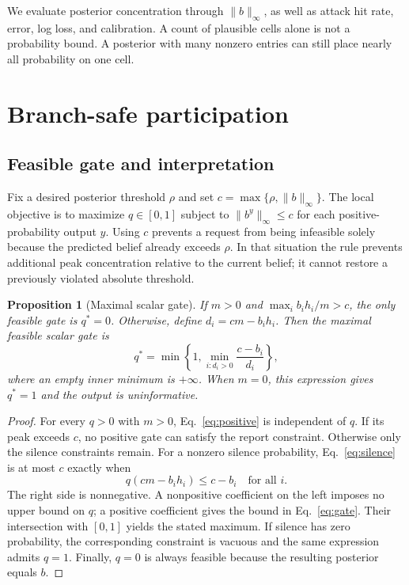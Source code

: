 \documentclass[review,12pt]{elsarticle}
\newtheorem{proposition}{Proposition}
\begin{document}
We evaluate posterior concentration through $\|b\|_\infty$, as well as attack hit rate, error, log loss, and calibration. A count of plausible cells alone is not a probability bound. A posterior with many nonzero entries can still place nearly all probability on one cell.

\section{Branch-safe participation}
\label{sec:method}
\subsection{Feasible gate and interpretation}
Fix a desired posterior threshold $\rho$ and set $c=\max\{\rho,\|b\|_\infty\}$. The local objective is to maximize $q\in[0,1]$ subject to $\|b^y\|_\infty\le c$ for each positive-probability output $y$. Using $c$ prevents a request from being infeasible solely because the predicted belief already exceeds $\rho$. In that situation the rule prevents additional peak concentration relative to the current belief; it cannot restore a previously violated absolute threshold.

\begin{proposition}[Maximal scalar gate]
If $m>0$ and $\max_i b_i h_i/m>c$, the only feasible gate is $q^*=0$. Otherwise, define $d_i=cm-b_i h_i$. Then the maximal feasible scalar gate is
\begin{equation}
 q^*=\min\left\{1,\min_{i:d_i>0}\frac{c-b_i}{d_i}\right\},
 \label{eq:gate}
\end{equation}
where an empty inner minimum is $+\infty$. When $m=0$, this expression gives $q^*=1$ and the output is uninformative.
\end{proposition}
\begin{proof}
For every $q>0$ with $m>0$, Eq.~\eqref{eq:positive} is independent of $q$. If its peak exceeds $c$, no positive gate can satisfy the report constraint. Otherwise only the silence constraints remain. For a nonzero silence probability, Eq.~\eqref{eq:silence} is at most $c$ exactly when
\begin{equation}
 q(cm-b_i h_i)\le c-b_i\quad\text{for all }i.
\end{equation}
The right side is nonnegative. A nonpositive coefficient on the left imposes no upper bound on $q$; a positive coefficient gives the bound in Eq.~\eqref{eq:gate}. Their intersection with $[0,1]$ yields the stated maximum. If silence has zero probability, the corresponding constraint is vacuous and the same expression admits $q=1$. Finally, $q=0$ is always feasible because the resulting posterior equals $b$.
\end{proof}
\end{document}
